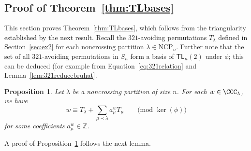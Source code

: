 \documentclass[12pt]{amsart}
\newtheorem{prop}[equation]{Proposition}
\theoremstyle{definition}
\theoremstyle{remark}
\numberwithin{equation}{section}
\newcommand{\ZZ}{\mathbb{Z}}
\newcommand{\TL}{\mathsf{TL}}
\newcommand{\NCP}{\mathrm{NCP}}
\begin{document}
\subsection{Proof of Theorem~\ref{thm:TLbases}}
\label{sec:basistheoremproof}

This section proves Theorem~\ref{thm:TLbases}, which follows from the triangularity established by the next result.  
Recall the $321$-avoiding permutations $T_{\lambda}$ defined in Section~\ref{sec:ex2} for each noncrossing partition $\lambda \in \NCP_{n}$.  
Further note that the set of all $321$-avoiding permutations in $S_{n}$ form a basis of $\TL_{n}(2)$ under $\phi$; this can be deduced (for example from Equation~\eqref{eq:321relation} and Lemma~\ref{lem:321reducebruhat}.  

\begin{prop}
\label{prop:TLbases}
Let $\lambda$ be a noncrossing partition of size $n$.  For each $w \in \CCC_{\lambda}$, we have
\[
w \equiv T_{\lambda} + \sum_{\mu \prec \lambda} a_{\mu}^{w} T_{\mu} \qquad \text{(mod $\ker(\phi)$)}
\]
for some coefficients $a_{\mu}^{w} \in \ZZ$.
\end{prop}

A proof of Proposition~\ref{prop:TLbases} follows the next lemma.
\end{document}
